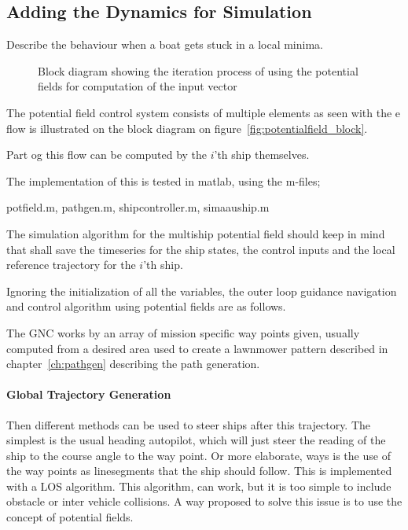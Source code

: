 \subsection{Adding the Dynamics for Simulation}

Describe the behaviour when a boat gets stuck in a local minima.

\begin{figure}[htbp]
\centering

\caption{Block diagram showing the iteration process of using the
potential fields for computation of the input vector}
\label{fig:potentialfield_block}
\end{figure}

The potential field control system consists of multiple elements
as seen with the e flow is illustrated on the block diagram on
figure~\vref{fig:potentialfield_block}.

Part og this flow can be computed by the $i$'th ship themselves.

The implementation of this is tested in matlab, using the m-files;

potfield.m, pathgen.m, shipcontroller.m, simaauship.m

The simulation algorithm for the multiship potential field should keep
in mind that shall save the timeseries for the ship states, the
control inputs and the local reference trajectory for the $i$'th ship.

Ignoring the initialization of all the variables, the outer loop
guidance navigation and control algorithm using potential fields are
as follows.

The \ac{GNC} works by an array of mission specific way points given,
usually computed from a desired area used to create a lawnmower
pattern described in chapter~\vref{ch:pathgen} describing the path
generation.

\paragraph{Global Trajectory Generation}
Then different methods can be used to steer ships after this
trajectory. The simplest is the usual heading autopilot, which will
just steer the reading of the ship to the course angle to the
way point. Or more elaborate, ways is the use of the way points as
linesegments that the ship should follow. This is implemented with a
\ac{LOS} algorithm. This algorithm, can work, but it is too simple to
include obstacle or inter vehicle collisions. A way proposed to solve
this issue is to use the concept of potential fields.

